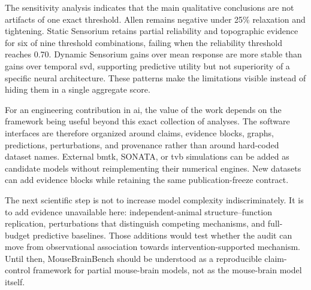 The sensitivity analysis indicates that the main qualitative conclusions are
not artifacts of one exact threshold. Allen remains negative under 25\%
relaxation and tightening. Static Sensorium retains partial reliability and
topographic evidence for six of nine threshold combinations, failing when the
reliability threshold reaches 0.70. Dynamic Sensorium gains over mean response
are more stable than gains over temporal \acs{svd}, supporting predictive utility but
not superiority of a specific neural architecture. These patterns make the
limitations visible instead of hiding them in a single aggregate score.

For an engineering contribution in \acs{ai}, the value of the
work depends on the framework being useful beyond this exact collection of
analyses. The software interfaces are therefore organized around claims,
evidence blocks, graphs, predictions, perturbations, and provenance rather than
around hard-coded dataset names. External \acs{bmtk}, SONATA, or \acs{tvb}
simulations can be added as candidate models without reimplementing their
numerical engines. New datasets can add evidence blocks while retaining the
same publication-freeze contract.

The next scientific step is not to increase model complexity indiscriminately.
It is to add evidence unavailable here: independent-animal structure--function
replication, perturbations that distinguish competing mechanisms, and
full-budget predictive baselines. Those additions would test whether the audit
can move from observational association towards intervention-supported
mechanism. Until then, MouseBrainBench should be understood as a reproducible
claim-control framework for partial mouse-brain models, not as the mouse-brain
model itself.
